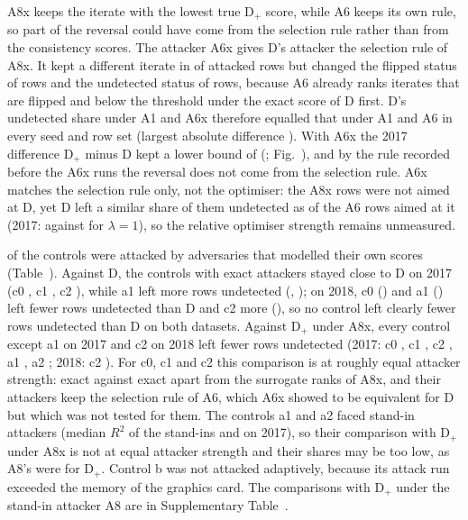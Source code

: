 A8x keeps the iterate with the lowest true D$_+$ score, while A6 keeps its own rule, so part of the reversal could have
come from the selection rule rather than from the consistency scores.
The attacker A6x gives D's attacker the selection rule of A8x.
It kept a different iterate in \sxRowsDiffer{} of \sxRowsAll{} attacked rows but changed the flipped status of
\sxFlipChanged{} rows and the undetected status of \sxUndetChanged{} rows, because A6 already ranks iterates that are
flipped and below the threshold under the exact score of D first.
D's undetected share under A1 and A6x therefore equalled that under A1 and A6 in every seed and row set (largest
absolute difference \sxSelMaxAbs).
With A6x the 2017 difference D$_+$ minus D kept a lower bound of \sxHeadVoneSeventeenLo{} (\sxHeadVoneSeventeenCI;
Fig.~\mainFigHeadline), and by the rule recorded before the A6x runs the reversal does not come from the selection
rule.
A6x matches the selection rule only, not the optimiser: the A8x rows were not aimed at D, yet D left a similar share of
them undetected as of the A6 rows aimed at it (2017: \evadeDAxOneSeventeen{} against \evadeDAsixOneSeventeen{} for
$\lambda = 1$), so the relative optimiser strength remains unmeasured.

\nControlsAttacked{} of the \nControlsAll{} controls were attacked by adversaries that modelled their own scores
(Table~\mainTabUnion).
Against D, the controls with exact attackers stayed close to D on 2017 (c0 \cmdCzeroVoneSeventeen, c1
\cmdConeVoneSeventeen, c2 \cmdCtwoVoneSeventeen), while a1 left more rows undetected (\cmdAoneVoneSeventeen,
\cmdAoneVoneSeventeenCI); on 2018, c0 (\cmdCzeroVoneEighteen) and a1 (\cmdAoneVoneEighteen) left fewer rows
undetected than D and c2 more (\cmdCtwoVoneEighteen), so no control left clearly fewer rows undetected than D on both
datasets.
Against D$_+$ under A8x, every control except a1 on 2017 and c2 on 2018 left fewer rows undetected (2017: c0
\cmxCzeroVoneSeventeen, c1 \cmxConeVoneSeventeen, c2 \cmxCtwoVoneSeventeen, a1 \cmxAoneVoneSeventeen{}
\cmxAoneVoneSeventeenCI, a2 \cmxAtwoVoneSeventeen; 2018: c2 \cmxCtwoVoneEighteen{} \cmxCtwoVoneEighteenCI).
For c0, c1 and c2 this comparison is at roughly equal attacker strength: exact against exact apart from the surrogate
ranks of A8x, and their attackers keep the selection rule of A6, which A6x showed to be equivalent for D but which was
not tested for them.
The controls a1 and a2 faced stand-in attackers (median $R^2$ of the stand-ins \rtwoMedAoneSeventeen{} and
\rtwoMedAtwoSeventeen{} on 2017), so their comparison with D$_+$ under A8x is not at equal attacker strength and their
shares may be too low, as A8's were for D$_+$.
Control b was not attacked adaptively, because its attack run exceeded the memory of the graphics card.
The comparisons with D$_+$ under the stand-in attacker A8 are in Supplementary Table~\suppTabUnionAeight.

